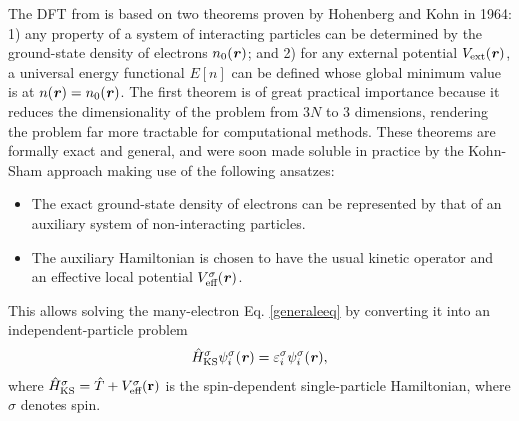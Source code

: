 The DFT from is based on two theorems proven by Hohenberg and Kohn
\cite{Hohenberg1964} in 1964: 1) any property of a system of interacting particles
can be determined by the ground-state density of electrons $n_0(\textbf{\textit r})$;
and 2) for any external potential $V_\text{ext}(\textbf{\textit r})$, a universal
energy functional $E[n]$ can be defined whose global minimum value is at
$n(\textbf{\textit r})=n_0(\textbf{\textit r})$. The first theorem is of great
practical importance because it reduces the dimensionality of the problem from $3N$
to 3 dimensions, rendering the problem far more tractable for computational methods.
These theorems are formally exact and general, and were soon made soluble in practice
by the Kohn-Sham approach \cite{Kohn1965} making use of the following ansatzes:
%
\begin{itemize}
\item The exact ground-state density of electrons can be represented by that of an auxiliary system of non-interacting particles.
\item The auxiliary Hamiltonian is chosen to have the usual kinetic operator and an effective local potential $V_\text{eff}^\sigma(\textbf{\textit r})$.
\end{itemize}
This allows solving the many-electron Eq. \ref{generaleeq} by converting it into an independent-particle problem 
\begin{equation}\label{kseq}
\begin{aligned}
\hat{H}_\text{KS}^\sigma\psi_i^\sigma(\textbf{\textit r})=\varepsilon_i^\sigma\psi_i^\sigma(\textbf{\textit r}), 
\end{aligned}
\end{equation}
where $\hat{H}_\text{KS}^\sigma=\hat{T}+V_\text{eff}^\sigma(\textbf r)$ is the
spin-dependent single-particle Hamiltonian, where $\sigma$ denotes spin.

